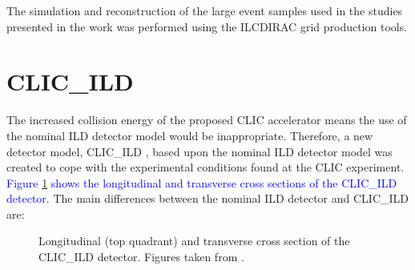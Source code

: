 The simulation and reconstruction of the large event samples used in the studies presented in the work was performed using the ILCDIRAC \cite{Grefe:2014sca, Tsaregorodtsev:2008zz} grid production tools.  


\section{CLIC\_ILD}
\label{sec:clicild}
The increased collision energy of the proposed CLIC accelerator means the use of the nominal ILD detector model would be inappropriate.  Therefore, a new detector model, CLIC\_ILD \cite{Linssen:2012hp,AlipourTehrani:2254048}, based upon the nominal ILD detector model was created to cope with the experimental conditions found at the CLIC experiment.  \textcolor{blue}{Figure \ref{fig:clicild} shows the longitudinal and transverse cross sections of the CLIC\_ILD detector.}  The main differences between the nominal ILD detector and CLIC\_ILD are:

\begin{figure}[h!]
\centering
{}
\hspace{1cm}
\caption[\protect{} Longitudinal (top quadrant) and \protect{} transverse cross section of the CLIC\_ILD detector.  Figures taken from \cite{Linssen:2012hp}.]{\protect{} Longitudinal (top quadrant) and \protect{} transverse cross section of the CLIC\_ILD detector.  Figures taken from \cite{Linssen:2012hp}.}
\label{fig:clicild}
\end{figure} 

